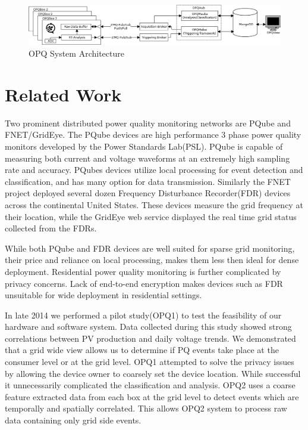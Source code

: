 \documentclass[a4paper, conference]{IEEEtran}
\begin{document}
\begin{figure}[htb!]\label{fig:system-architecture}
    \centering
    \includegraphics[width=0.9\linewidth]{img/system-diagram}
    \caption{OPQ System Architecture}
\end{figure}

\section{Related Work}

Two prominent distributed power quality monitoring networks are PQube and FNET/GridEye. The PQube devices are high performance 3 phase power quality monitors developed by the Power Standards Lab(PSL). PQube is capable of measuring both current and voltage waveforms at an extremely high sampling rate and accuracy. PQubes devices utilize local processing for event detection and classification, and has many option for data transmission. Similarly the FNET project deployed several dozen Frequency Disturbance Recorder(FDR) devices across the continental United States. These devices measure the grid frequency at their location, while the GridEye web service displayed the real time grid status collected from the FDRs.

While both PQube and FDR devices are well suited for sparse grid monitoring, their price and reliance on local processing, makes them less then ideal for dense deployment. Residential power quality monitoring is further complicated by privacy concerns. Lack of end-to-end encryption makes devices such as FDR unsuitable for wide deployment in residential settings. 

In late 2014 we performed a pilot study(OPQ1) to test the feasibility of our hardware and software system. Data collected during this study showed strong correlations between PV production and daily voltage trends. We demonstrated that a grid wide view allows us to determine if PQ events take place at the consumer level or at the grid level. OPQ1 attempted to solve the privacy issues by allowing the device owner to coarsely set the device location. While successful it unnecessarily complicated the classification and analysis. OPQ2 uses a coarse feature extracted data from each box at the grid level to detect events which are temporally and spatially correlated. This allows OPQ2 system to process raw data containing only grid side events. 
\end{document}
